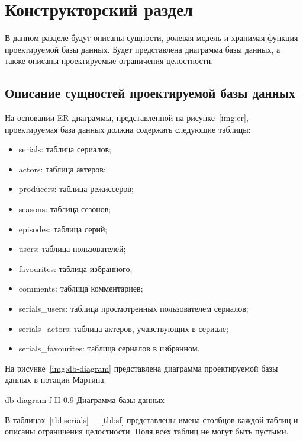 \chapter{Конструкторский раздел}

В данном разделе будут описаны сущности, ролевая модель и хранимая функция проектируемой базы данных.
Будет представлена диаграмма базы данных, а также описаны проектируемые ограничения целостности.

\section{Описание сущностей проектируемой базы данных}

На основании ER-диаграммы, представленной на рисунке~\ref{img:er}, проектируемая база данных должна содержать следующие таблицы:
\begin{itemize}[label=---]
    \item serials: таблица сериалов;
    \item actors: таблица актеров;
    \item producers: таблица режиссеров;
    \item seasons: таблица сезонов;
    \item episodes: таблица серий;
    \item users: таблица пользователей;
    \item favourites: таблица избранного;
    \item comments: таблица комментариев;
    \item serials\_users: таблица просмотренных пользователем сериалов;
    \item serials\_actors: таблица актеров, учавствующих в сериале;
    \item serials\_favourites: таблица сериалов в избранном.
\end{itemize}

На рисунке~\ref{img:db-diagram} представлена диаграмма проектируемой базы данных в нотации Мартина.

    {db-diagram}
    {f}
    {H}
    {0.9\textwidth}
    {Диаграмма базы данных}

В таблицах~\ref{tbl:serials}~--~\ref{tbl:sf} представлены имена столбцов каждой таблиц и описаны ограничения целостности.
Поля всех таблиц не могут быть пустыми.

